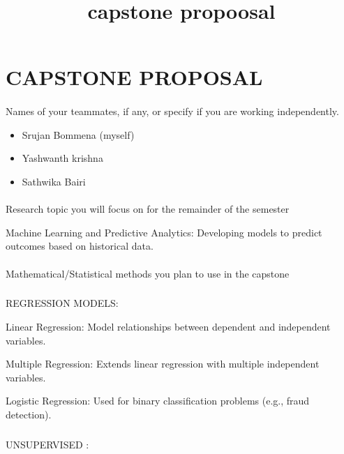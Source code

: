 \documentclass[
  letterpaper,
  DIV=11,
  numbers=noendperiod]{scrartcl}
\title{capstone propoosal}
\author{}
\date{}
\makeatletter
\let\oldparagraph\paragraph
\renewcommand{\paragraph}{
    \@ifstar
      \xxxParagraphStar
      \xxxParagraphNoStar
  }
\newcommand{\xxxParagraphStar}[1]{\oldparagraph*{#1}\mbox{}}
\newcommand{\xxxParagraphNoStar}[1]{\oldparagraph{#1}\mbox{}}
\let\oldsubparagraph\subparagraph
\renewcommand{\subparagraph}{
    \@ifstar
      \xxxSubParagraphStar
      \xxxSubParagraphNoStar
  }
\newcommand{\xxxSubParagraphStar}[1]{\oldsubparagraph*{#1}\mbox{}}
\newcommand{\xxxSubParagraphNoStar}[1]{\oldsubparagraph{#1}\mbox{}}
\providecommand{\tightlist}{%
  \setlength{\itemsep}{0pt}\setlength{\parskip}{0pt}}\usepackage{longtable,booktabs,array}
\makeatother
\begin{document}
\maketitle


\section{CAPSTONE PROPOSAL}\label{capstone-proposal}

\paragraph{Names of your teammates, if any, or specify if you are
working
independently.}\label{names-of-your-teammates-if-any-or-specify-if-you-are-working-independently.}

\begin{itemize}
\tightlist
\item
  Srujan Bommena (myself)
\item
  Yashwanth krishna
\item
  Sathwika Bairi
\end{itemize}

\paragraph{Research topic you will focus on for the remainder of the
semester}\label{research-topic-you-will-focus-on-for-the-remainder-of-the-semester}

Machine Learning and Predictive Analytics: Developing models to predict
outcomes based on historical data.

\paragraph{Mathematical/Statistical methods you plan to use in the
capstone}\label{mathematicalstatistical-methods-you-plan-to-use-in-the-capstone}

\subparagraph{REGRESSION MODELS:}\label{regression-models}

Linear Regression: Model relationships between dependent and independent
variables.

Multiple Regression: Extends linear regression with multiple independent
variables.

Logistic Regression: Used for binary classification problems (e.g.,
fraud detection).

\subparagraph{UNSUPERVISED :}\label{unsupervised}
\end{document}
